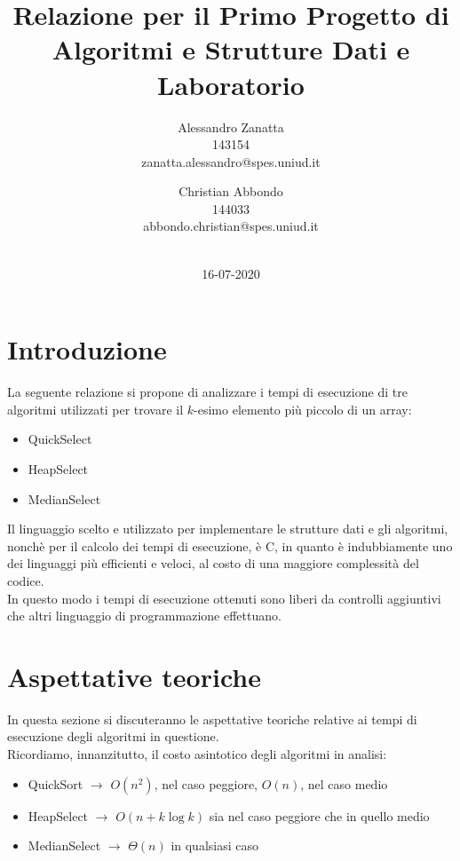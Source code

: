 \documentclass{article}
\title{Relazione per il Primo Progetto di Algoritmi e Strutture Dati e Laboratorio}
\date{16-07-2020}
\author{Alessandro Zanatta \\ 143154 \\ zanatta.alessandro@spes.uniud.it\\ \and Christian Abbondo \\ 144033 \\ abbondo.christian@spes.uniud.it\\ \\}
\begin{document}
	\maketitle
	\newpage
	
	
	\tableofcontents	
	\newpage
	
	\section{Introduzione}
	La seguente relazione si propone di analizzare i tempi di esecuzione di tre algoritmi utilizzati per trovare il $k$-esimo elemento più piccolo di un array: 
	\begin{itemize}
		\item QuickSelect
		\item HeapSelect
		\item MedianSelect
	\end{itemize}
	 
	Il linguaggio scelto e utilizzato per implementare le strutture dati e gli algoritmi, nonchè per il calcolo dei tempi di esecuzione, è C, in quanto è indubbiamente uno dei linguaggi più efficienti e veloci, al costo di una maggiore complessità del codice. \\ In questo modo i tempi di esecuzione ottenuti sono liberi da controlli aggiuntivi che altri linguaggio di programmazione effettuano.
	\newpage
	
	
	\section{Aspettative teoriche}
	In questa sezione si discuteranno le aspettative teoriche relative ai tempi di esecuzione degli algoritmi in questione.
	\\
	Ricordiamo, innanzitutto, il costo asintotico degli algoritmi in analisi:
	
	
	\begin{itemize}
		\item QuickSort $\rightarrow$ $O\left(n^{2}\right)$, nel caso peggiore, $O\left(n\right)$, nel caso medio
		\item HeapSelect $\rightarrow$ $O(n + k\log{k})$ sia nel caso peggiore che in quello medio
		\item MedianSelect $\rightarrow$ $\Theta(n)$ in qualsiasi caso
	\end{itemize}
	
\end{document}
